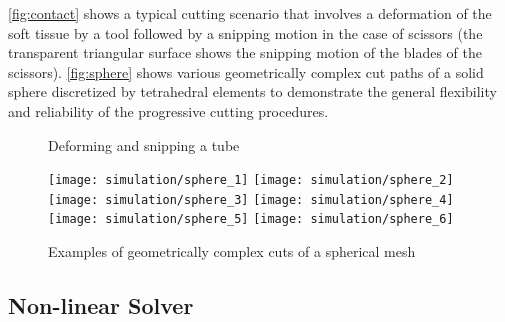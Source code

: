 \autoref{fig:contact} shows a typical cutting scenario that involves a deformation of the soft tissue by a tool followed by a snipping motion in the case of scissors (the transparent triangular surface shows the snipping motion of the blades of the scissors).
\autoref{fig:sphere} shows various geometrically complex cut paths of a solid sphere discretized by tetrahedral elements to demonstrate the general flexibility and reliability of the progressive cutting procedures.
\begin{figure}
  \centering%
  \setlength{\fboxsep}{0pt}%
  \setlength{\fboxrule}{0.1pt}%
  \caption{Deforming and snipping a tube}
  \label{fig:contact}
\end{figure}

\begin{figure}
  \centering%
	\texttt{[image: simulation/sphere\_1]}\hfill%
	\texttt{[image: simulation/sphere\_2]}\\[1.5ex]
	\texttt{[image: simulation/sphere\_3]}\hfill%
	\texttt{[image: simulation/sphere\_4]}\\[1.5ex]
	\texttt{[image: simulation/sphere\_5]}\hfill%
	\texttt{[image: simulation/sphere\_6]}\\
	\caption{Examples of geometrically complex cuts of a spherical mesh}
	\label{fig:sphere}
\end{figure}




\subsection{Non-linear Solver}
\label{ssec:nonlinear_solver}

